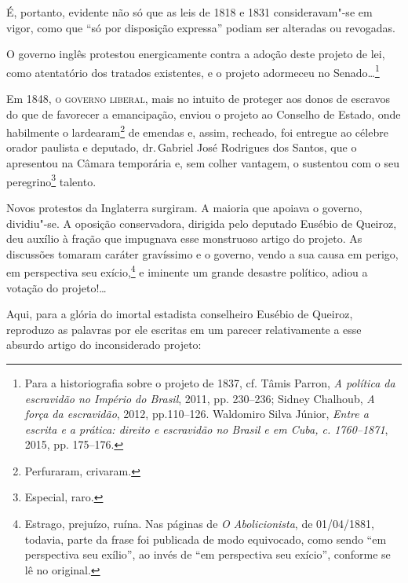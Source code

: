 É, portanto, evidente não só que as leis de 1818 e 1831 consideravam"-se
em vigor, como que ``só por disposição expressa'' podiam ser alteradas ou
revogadas.

O governo inglês protestou energicamente contra a adoção deste projeto
de lei, como atentatório dos tratados existentes, e o projeto adormeceu
no Senado\ldots{}\footnote{Para a historiografia sobre o projeto de 1837,
  cf. Tâmis Parron, \emph{A política da escravidão no Império do
  Brasil}, 2011, pp. 230--236; Sidney Chalhoub, \emph{A força da
  escravidão}, 2012, pp.110--126. Waldomiro Silva Júnior, \emph{Entre a
  escrita e a prática: direito e escravidão no Brasil e em Cuba, c.
  1760--1871}, 2015, pp. 175--176.}

Em 1848, \textsc{o governo liberal}, mais no intuito de proteger aos donos de
escravos do que de favorecer a emancipação, enviou o projeto ao Conselho
de Estado, onde habilmente o lardearam\footnote{Perfuraram, crivaram.}
de emendas e, assim, recheado, foi entregue ao célebre orador paulista e
deputado, dr.\,Gabriel José Rodrigues dos Santos, que o apresentou na
Câmara temporária e, sem colher vantagem, o sustentou com o seu
peregrino\footnote{Especial, raro.} talento.

Novos protestos da Inglaterra surgiram. A maioria que apoiava o governo,
dividiu"-se. A oposição conservadora, dirigida pelo deputado Eusébio de
Queiroz, deu auxílio à fração que impugnava esse monstruoso artigo do
projeto. As discussões tomaram caráter gravíssimo e o governo, vendo a
sua causa em perigo, em perspectiva seu exício,\footnote{Estrago,
  prejuízo, ruína. Nas páginas de \emph{O Abolicionista}, de 01/04/1881,
  todavia, parte da frase foi publicada de modo equivocado, como sendo
  ``em perspectiva seu exílio'', ao invés de ``em perspectiva seu exício'',
  conforme se lê no original.} e iminente um grande desastre político,
adiou a votação do projeto!\ldots{}

Aqui, para a glória do imortal estadista conselheiro Eusébio de Queiroz,
reproduzo as palavras por ele escritas em um parecer relativamente a
esse absurdo artigo do inconsiderado projeto:

